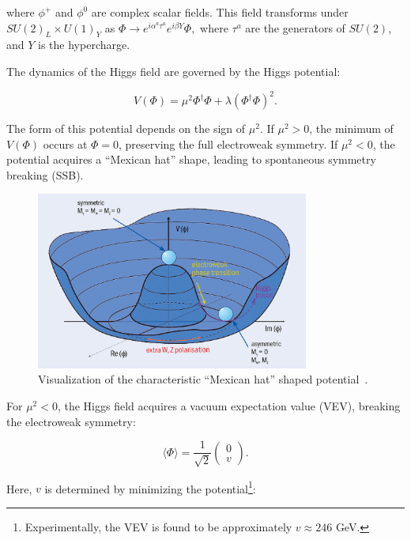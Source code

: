 where \( \phi^+ \) and \( \phi^0 \) are complex scalar fields. This field transforms under \( SU(2)_L \times U(1)_Y \) as \(\Phi \to e^{i\alpha^a \tau^a} e^{i\beta Y} \Phi,\) where \( \tau^a \) are the generators of \( SU(2) \), and \( Y \) is the hypercharge.

The dynamics of the Higgs field are governed by the Higgs potential:

\begin{equation}
\label{eq:higgpot}
V(\Phi) = \mu^2 \Phi^\dagger \Phi + \lambda (\Phi^\dagger \Phi)^2.
\end{equation}

The form of this potential depends on the sign of \( \mu^2 \). If \( \mu^2 > 0 \), the minimum of \( V(\Phi) \) occurs at \( \Phi = 0 \), preserving the full electroweak symmetry. If \( \mu^2 < 0 \), the potential acquires a ``Mexican hat'' shape, leading to spontaneous symmetry breaking (SSB).

\begin{figure}[h!]
  \centering
  \includegraphics[width=0.8\textwidth,clip] {figures/CERNliftinglid.jpg}
  \caption{Visualization of the characteristic ``Mexican hat'' shaped potential~\cite{Thethril79:online}.}
  \label{fig:mexicanhat}
\end{figure}

For \( \mu^2 < 0 \), the Higgs field acquires a vacuum expectation value (VEV), breaking the electroweak symmetry:

\begin{equation}
\label{eq:higgssymmetry}
\langle \Phi \rangle = \frac{1}{\sqrt{2}} \begin{pmatrix} 0 \\ v \end{pmatrix}.
\end{equation}

Here, \( v \) is determined by minimizing the potential\footnote{Experimentally, the VEV is found to be approximately \( v \approx 246 \) GeV.}:

